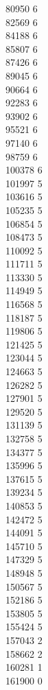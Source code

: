 { 80950	6 \\
 82569	6 \\
 84188	6 \\
 85807	6 \\
 87426	6 \\
 89045	6 \\
 90664	6 \\
 92283	6 \\
 93902	6 \\
 95521	6 \\
 97140	6 \\
 98759	6 \\
 100378	6 \\
 101997	5 \\
 103616	5 \\
 105235	5 \\
 106854	5 \\
 108473	5 \\
 110092	5 \\
 111711	5 \\
 113330	5 \\
 114949	5 \\
 116568	5 \\
 118187	5 \\
 119806	5 \\
 121425	5 \\
 123044	5 \\
 124663	5 \\
 126282	5 \\
 127901	5 \\
 129520	5 \\
 131139	5 \\
 132758	5 \\
 134377	5 \\
 135996	5 \\
 137615	5 \\
 139234	5 \\
 140853	5 \\
 142472	5 \\
 144091	5 \\
 145710	5 \\
 147329	5 \\
 148948	5 \\
 150567	5 \\
 152186	5 \\
 153805	5 \\
 155424	5 \\
 157043	2 \\
 158662	2 \\
 160281	1 \\
 161900	0 \\
}
